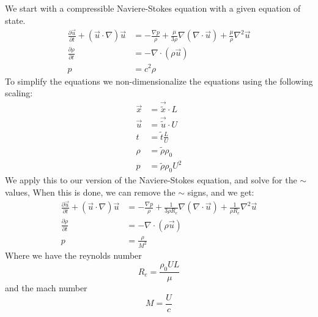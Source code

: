 \documentclass{article}
\begin{document}
We start with a compressible Naviere-Stokes equation with a given equation of state.
\begin{align}
  \frac{\partial \vec{u}}{\partial t} + (\vec{u} \cdot \nabla)\vec{u} &= -\frac{\nabla p}{\rho} + \frac{\mu}{3\rho}\nabla (\nabla \cdot \vec{u}) + \frac{\mu}{\rho}\nabla^2 \vec{u} \\
  \frac{\partial \rho}{\partial t} &= -\nabla \cdot (\rho\vec{u}) \\
  p &= c^2\rho
\end{align}
To simplify the equations we non-dimensionalize the equations using the following scaling:
\begin{align}
  \vec{x} &= \vec{\tilde{x}} \cdot L \\
  \vec{u} &= \vec{\tilde{u}} \cdot U \\
  t &= \tilde{t}\frac{L}{U} \\
  \rho &= \tilde{\rho}\rho_0 \\
  p &= \tilde{\rho}\rho_0U^2 
\end{align}
We apply this to our version of the Naviere-Stokes equation, and solve for the $\sim$ values, When this is done, we can remove the $\sim$ signs, and we get:
\begin{align}
  \frac{\partial \vec{u}}{\partial t} + (\vec{u} \cdot \nabla)\vec{u} &= -\frac{\nabla p}{\rho} + \frac{1}{3\rho R_e}\nabla(\nabla \cdot \vec{u}) + \frac{1}{\rho R_e}\nabla^2\vec{u} \\
  \frac{\partial \rho}{\partial t} &= -\nabla \cdot(\rho \vec{u}) \\
  p &= \frac{\rho}{M^2}
\end{align}
Where we have the reynolds number
\[R_e = \frac{\rho_0UL}{\mu}\]
and the mach number
\[M = \frac{U}{c}\]
\end{document}
